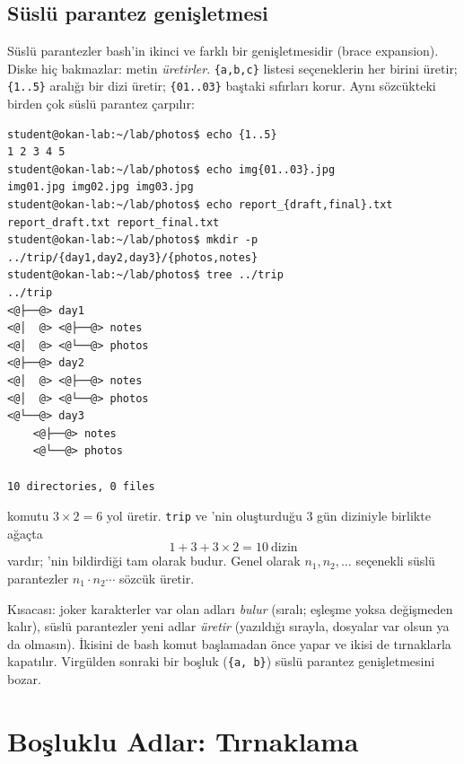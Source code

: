 \subsection{Süslü parantez genişletmesi}

Süslü parantezler bash'in ikinci ve farklı bir genişletmesidir (brace expansion). Diske hiç bakmazlar: metin \emph{üretirler}. \texttt{\{a,b,c\}} listesi seçeneklerin her birini üretir; \texttt{\{1..5\}} aralığı bir dizi üretir; \texttt{\{01..03\}} baştaki sıfırları korur. Aynı sözcükteki birden çok süslü parantez çarpılır:

\begin{lstlisting}[style=term]
student@okan-lab:~/lab/photos$ echo {1..5}
1 2 3 4 5
student@okan-lab:~/lab/photos$ echo img{01..03}.jpg
img01.jpg img02.jpg img03.jpg
student@okan-lab:~/lab/photos$ echo report_{draft,final}.txt
report_draft.txt report_final.txt
student@okan-lab:~/lab/photos$ mkdir -p ../trip/{day1,day2,day3}/{photos,notes}
student@okan-lab:~/lab/photos$ tree ../trip
../trip
<@├──@> day1
<@│  @> <@├──@> notes
<@│  @> <@└──@> photos
<@├──@> day2
<@│  @> <@├──@> notes
<@│  @> <@└──@> photos
<@└──@> day3
    <@├──@> notes
    <@└──@> photos

10 directories, 0 files
\end{lstlisting}

\begin{example}
 komutu $3 \times 2 = 6$ yol üretir. \texttt{trip} ve 'nin oluşturduğu $3$ gün diziniyle birlikte ağaçta
\[
1 + 3 + 3 \times 2 = 10 \ \text{dizin}
\]
vardır; 'nin bildirdiği tam olarak budur. Genel olarak $n_1, n_2, \dots$ seçenekli süslü parantezler $n_1 \cdot n_2 \cdots$ sözcük üretir.
\end{example}

Kısacası: joker karakterler var olan adları \emph{bulur} (sıralı; eşleşme yoksa değişmeden kalır), süslü parantezler yeni adlar \emph{üretir} (yazıldığı sırayla, dosyalar var olsun ya da olmasın).
İkisini de bash komut başlamadan önce yapar ve ikisi de tırnaklarla kapatılır. Virgülden sonraki bir boşluk (\texttt{\{a, b\}}) süslü parantez genişletmesini bozar.

\section{Boşluklu Adlar: Tırnaklama}

